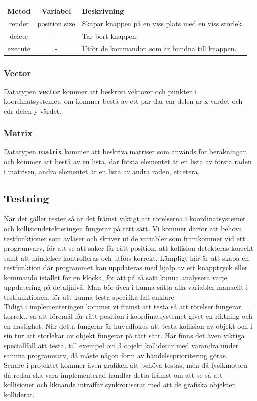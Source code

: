 \documentclass[12pt,a4paper]{article}
\begin{document}
\begin{tabular}{| c | c | p{8.9cm} |}
	\hline
	\textbf{Metod} & \textbf{Variabel} & \textbf{Beskrivning} \\
	\hline
	
	render & position size & Skapar knappen på en viss plats med en viss storlek.\\
	\hline
	delete & - & Tar bort knappen. \\
	\hline
	execute & - & Utför de kommandon som är bundna till knappen. \\
	\hline
\end{tabular}

\subsubsection{Vector}
Datatypen \textbf{vector} kommer att beskriva vektorer och punkter i koordinatsystemet, om kommer bestå av ett par där car-delen är x-värdet och cdr-delen y-värdet.

\subsubsection{Matrix}
Datatypen \textbf{matrix} kommer att beskriva matriser som används för beräkningar, och kommer att bestå av en lista, där första elementet är en lista av första raden i matrisen, andra elementet är en lista av andra raden, etcetera.


\subsection{Testning}
När det gäller tester så är det främst viktigt att rörelserna i koordinatsystemet och kollisiondetekteringen fungerar på rätt sätt. Vi kommer därför att behöva testfunktioner som avläser och skriver ut de variabler som framkommer vid ett programvarv, för att se att saker får rätt position, att kollision detekteras korrekt samt att händelser kontrolleras och utförs korrekt. Lämpligt här är att skapa en testfunktion där programmet kan uppdateras med hjälp av ett knapptryck eller kommando istället för en klocka, för att på så sätt kunna analysera varje uppdatering på detaljnivå. Man bör även i kunna sätta alla variabler manuellt i testfunktionen, för att kunna testa specifika fall enklare. \\

Tidigt i implementeringen kommer vi främst att testa så att rörelser fungerar korrekt, så att föremål får rätt position i koordinatsystemet givet en riktning och en hastighet. När detta fungerar är huvudfokus att testa kollision av objekt och i sin tur att storlekar av objekt fungerar på rätt sätt. Här finns det även viktiga speciallfall att testa, till exempel om 3 objekt kolliderar med varandra under samma programvarv, då måste någon form av händelseprioritering göras. \\

Senare i projektet kommer även grafiken att behöva testas, men då fysikmotorn då redan ska vara implementerad handlar detta främst om att se så att kollisioner och liknande inträffar synkroniserat med att de grafiska objekten kolliderar.
\end{document}
